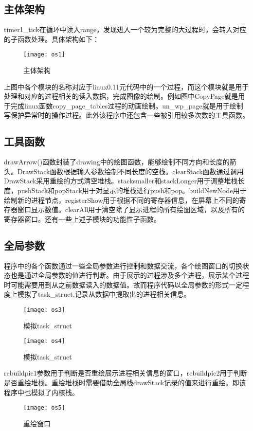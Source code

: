 \documentclass[]{report}
\begin{document}
\subsection{主体架构}
timer1\_tick在循环中读入range，发现进入一个较为完整的大过程时，会转入对应的子函数处理。具体架构如下：
\begin{figure}[H]%
	\centering  %
	\texttt{[image: os1]}  
	\caption{主体架构}  %
	\label{fig5}
\end{figure}
上图中各个模块的名称对应于linux0.11元代码中的一个过程，而这个模块就是用于处理和对应的过程相关的读入数据，完成图像的绘制。例如图中CopyPage就是用于完成linux函数copy\_page\_tables过程的动画绘制。un\_wp\_page就是用于绘制写保护异常时的操作过程。此外该程序中还包含一些被引用较多次数的工具函数。\\

\subsection{工具函数}
drawArrow()函数封装了drawing中的绘图函数，能够绘制不同方向和长度的箭头。DrawStack函数根据输入参数绘制不同长度的空栈。clearStack函数通过调用DrawStack采用重绘的方式清空堆栈。stacksmaller和stackLonger用于调整堆栈长度，pushStack和popStack用于对显示的堆栈进行push和pop。buildNewNode用于绘制新的进程节点，registerShow用于根据不同的寄存器信息，在屏幕上不同的寄存器窗口显示数值。clearAll用于清空除了显示进程的所有绘图区域，以及所有的寄存器窗口。还有一些上述子模块的功能性子函数。\\

\subsection{全局参数}
程序中的各个函数通过一些全局参数进行控制和数据交流，各个绘图窗口的切换状态也是通过全局参数的值进行判断。由于展示的过程涉及多个进程，展示某个过程时可能需要用到从之前数据读入的数据值。故而程序代码以全局参数的形式一定程度上模拟了task\_struct,记录从数据中提取出的进程相关信息。
\begin{figure}[H]%
	\centering  %
	\texttt{[image: os3]}  
	\caption{模拟task\_struct}  %
	\label{fig6}
\end{figure}
\begin{figure}[H]%
	\centering  %
	\texttt{[image: os4]}  
	\caption{模拟task\_struct}  %
	\label{fig7}
\end{figure}
rebuildpic1参数用于判断是否重绘展示进程相关信息的窗口，rebuildpic2用于判断是否重绘堆栈。重绘堆栈时需要借助全局栈drawStack记录的值来进行重绘。即该程序中也模拟了内核栈。
\begin{figure}[H]%
	\centering  %
	\texttt{[image: os5]}  
	\caption{重绘窗口}  %
	\label{fig8}
\end{figure}
\end{document}
